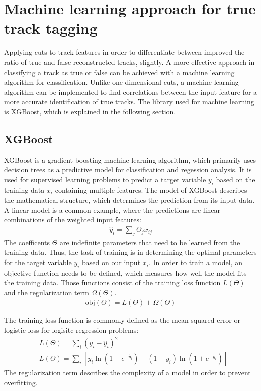 \chapter{Machine learning approach for true track tagging}
Applying cuts to track features in order to differentiate between improved the ratio of true and false reconstructed tracks, slightly. A more effective
approach in classifying a track as true or false can be achieved with a machine learning algorithm for classification. Unlike one dimensional cuts, a machine learning
algorithm can be implemented to find correlations between the input feature for a more accurate identification of true tracks. The library used for
machine learning is XGBoost, which is explained in the following section.

\section{XGBoost}
XGBoost \cite{xgboost} is a gradient boosting machine learning algorithm, which primarily uses decision trees as a predictive model for classification and regession analysis.
It is used for supervised learning problems to predict a target variable $y_i$ based on the training data $x_i$ containing multiple features. The model
of XGBoost describes the mathematical structure, which determines the prediction from its input data. A linear model is a common example, where the predictions
are linear combinations of the weighted input features:
\begin{align}
  \hat{y}_i = \sum_j \Theta_j x_{ij}
\end{align}
The coefficents $\Theta$ are indefinite parameters that need to be learned from the training data. Thus, the task of training is in determining the optimal parameters
for the target variable $y_i$ based on our input $x_i$. In order to train a model, an objective function needs to be defined, which measures how well
the model fits the training data. Those functions consist of the training loss function $L(\Theta) $ and the regularization term $\Omega (\Theta)$.
\begin{align}
  \text{obj}(\Theta) = L(\Theta) + \Omega(\Theta)
\end{align}

The training loss function is commonly defined as the mean squared error or logistic loss for logisitc regression problems:
\begin{align}
  &L(\Theta) = \sum_i (y_i - \hat{y}_i)^2 \\
  &L(\Theta) = \sum_i [y_i \ln{(1 + e^{-\hat{y}_i})} + (1 - y_i) \ln{(1 + e^{-\hat{y}_i})}]
\end{align}
The regularization term describes the complexity of a model in order to prevent overfitting.

